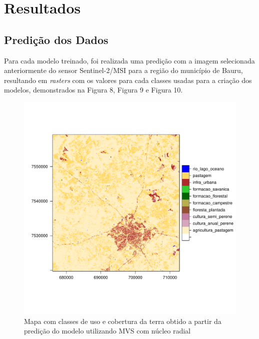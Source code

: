 \section{Resultados}\label{resultados}

\subsection{Predição dos Dados}\label{predicao-dos-dados}

	Para cada modelo treinado, foi realizada uma predição com a imagem
selecionada anteriormente do sensor  Sentinel-2/MSI para a região do
município de Bauru, resultando em \emph{rasters} com os valores para
cada classes usadas para a criação dos modelos, demonstrados na Figura 8, Figura 9 e Figura 10.

\begin{figure}[H]
    \centering
    \caption{Mapa com classes de uso e cobertura da terra obtido a partir da predição do modelo utilizando MVS com núcleo radial} 
    \includegraphics[scale=0.8]{figs/map_svm-radial.pdf}
\end{figure}
